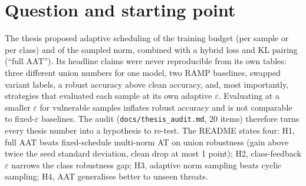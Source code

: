 \documentclass[11pt]{article}
\begin{document}
\section{Question and starting point}
The thesis proposed adaptive scheduling of the training budget (per sample or per class) and of the sampled norm, combined with a hybrid loss and
KL pairing (``full AAT''). Its headline claims were never reproducible from its own tables: three different union numbers for one model, two RAMP baselines,
swapped variant labels, a robust accuracy above clean accuracy, and, most importantly, strategies that evaluated each sample at its own adaptive $\varepsilon$.
Evaluating at a smaller $\varepsilon$ for vulnerable samples inflates robust accuracy and is not comparable to fixed-$\varepsilon$ baselines.
The audit (\texttt{docs/thesis\_audit.md}, 20 items) therefore turns every thesis number into a hypothesis to re-test. The README states four:
H1, full AAT beats fixed-schedule multi-norm AT on union robustness (gain above twice the seed standard deviation, clean drop at most 1 point);
H2, class-feedback $\varepsilon$ narrows the class robustness gap; H3, adaptive norm sampling beats cyclic sampling; H4, AAT generalises better to unseen threats.
\end{document}
